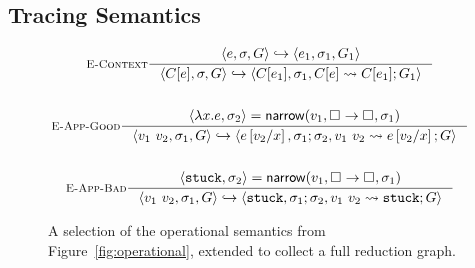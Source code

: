 \subsection{Tracing Semantics}
\label{sec:inter-semant}
%
\begin{figure}[t]
\begin{gather*}
\inference[\recontext]
  {\stepg{e}{\su}{\tr}{e_1}{\su_1}{\tr_1}}
  {\stepg{C[e]}{\su}{\tr}{C[e_1]}{\su_1}{\singlestep{C[e]}{C[e_1]}; \tr_1}}
\\ \\
\inference[\reappgood]
  {\pair{\efun{x}{e}}{\su_2} = \force{v_1}{\tfun{\thole{}}{\thole{}}}{\su_1}}
  {\stepg{\eapp{v_1}{v_2}}{\su_1}{\tr}
         {e\sub{x}{v_2}}{\su_1;\su_2}{\singlestep{\eapp{v_1}{v_2}}{e\sub{x}{v_2}}; \tr}}
\\ \\
\inference[\reappbad]
  {\pair{\stuck}{\su_2} = \force{v_1}{\tfun{\thole{}}{\thole{}}}{\su_1}}
  {\stepg{\eapp{v_1}{v_2}}{\su_1}{\tr}{\stuck}{\su_1;\su_2}{\singlestep{\eapp{v_1}{v_2}}{\stuck}; \tr}}
\end{gather*}
\caption{A selection of the operational semantics from
  Figure~\ref{fig:operational}, extended to collect a full reduction
  graph.}
\label{fig:interactive}
\end{figure}

